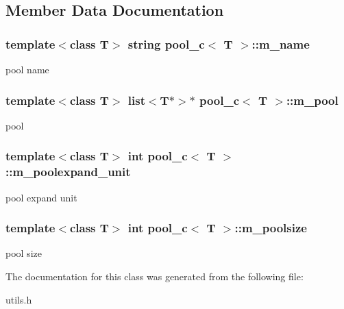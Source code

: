 \subsection{Member Data Documentation}
\hypertarget{classpool__c_a38ccabc9cf0fe92037e915485f02bf98}{
\subsubsection[{m\_\-name}]{\setlength{\rightskip}{0pt plus 5cm}template$<$class T$>$ string {\bf pool\_\-c}$<$ T $>$::{\bf m\_\-name}}}
\label{classpool__c_a38ccabc9cf0fe92037e915485f02bf98}
pool name \hypertarget{classpool__c_ad882da850ef2313b4f2fb6c34ef3d760}{
\subsubsection[{m\_\-pool}]{\setlength{\rightskip}{0pt plus 5cm}template$<$class T$>$ list$<$T$\ast$$>$$\ast$ {\bf pool\_\-c}$<$ T $>$::{\bf m\_\-pool}}}
\label{classpool__c_ad882da850ef2313b4f2fb6c34ef3d760}
pool \hypertarget{classpool__c_a439d24816449390c4b7ff8b9cac84faf}{
\subsubsection[{m\_\-poolexpand\_\-unit}]{\setlength{\rightskip}{0pt plus 5cm}template$<$class T$>$ int {\bf pool\_\-c}$<$ T $>$::{\bf m\_\-poolexpand\_\-unit}}}
\label{classpool__c_a439d24816449390c4b7ff8b9cac84faf}
pool expand unit \hypertarget{classpool__c_aa20a955bf65ee7898e1028a76384c7bc}{
\subsubsection[{m\_\-poolsize}]{\setlength{\rightskip}{0pt plus 5cm}template$<$class T$>$ int {\bf pool\_\-c}$<$ T $>$::{\bf m\_\-poolsize}}}
\label{classpool__c_aa20a955bf65ee7898e1028a76384c7bc}
pool size 

The documentation for this class was generated from the following file:\begin{DoxyCompactItemize}
\item 
utils.h\end{DoxyCompactItemize}
